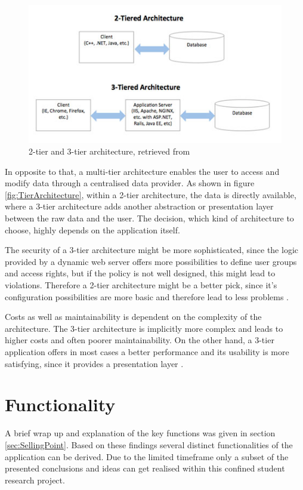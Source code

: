 \begin{figure}[h]
  	\centering
  	\includegraphics[width=0.7\linewidth]{./images/tier-architecture.jpg}
  	\caption{2-tier and 3-tier architecture, retrieved from \cite{Wright:2015aa}}
	\label{fig:TierArchitecture}
\end{figure}
\nocite{Wright:2015aa}

In opposite to that, a multi-tier architecture enables the user to access and modify data through a centralised data provider. As shown in figure \vref{fig:TierArchitecture}, within a 2-tier architecture, the data is directly available, where a 3-tier architecture adds another abstraction or presentation layer between the raw data and the user. The decision, which kind of architecture to choose, highly depends on the application itself. 

The security of a 3-tier architecture might be more sophisticated, since the logic provided by a dynamic web server offers more possibilities to define user groups and access rights, but if the policy is not well designed, this might lead to violations. Therefore a 2-tier architecture might be a better pick, since it's configuration possibilities are more basic and therefore lead to less problems \cite{Wright:2015aa}.

Costs as well as maintainability is dependent on the complexity of the architecture. The 3-tier architecture is implicitly more complex and leads to higher costs and often poorer maintainability. On the other hand, a 3-tier application offers in most cases a better performance and its usability is more satisfying, since it provides a presentation layer \cite{Wright:2015aa}.

\section{Functionality} %
\label{sec:Functionality}

A brief wrap up and explanation of the key functions was given in section \vref{sec:SellingPoint}. Based on these findings several distinct functionalities of the application can be derived. Due to the limited timeframe only a subset of the presented conclusions and ideas can get realised within this confined student research project.

